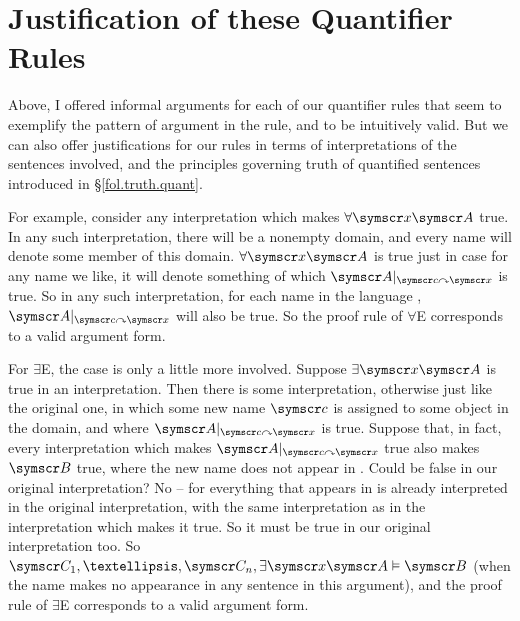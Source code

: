 \section{Justification of these Quantifier Rules}

Above, I offered informal arguments for each of our quantifier rules that seem to exemplify the pattern of argument in the rule, and to be intuitively valid. But we can also offer justifications for our rules in terms of interpretations of the sentences involved, and the principles governing truth of quantified sentences introduced in §\ref{fol.truth.quant}. 

For example, consider any interpretation which makes $\forall\meta{x}\meta{A}$ true. In any such interpretation, there will be a nonempty domain, and every name will denote some member of this domain. $\forall\meta{x}\meta{A}$ is true just in case for any name we like, it will denote something of which $\meta{A}\subs{\meta{c}}{\meta{x}}$ is true. So in any such interpretation, for each name in the language , $\meta{A}\subs{\meta{c}}{\meta{x}}$ will also be true. So the proof rule of $\forall$E corresponds to a valid argument form.

For $\exists$E, the case is only a little more involved. Suppose $\exists\meta{x}\meta{A}$ is true in an interpretation. Then there is some interpretation, otherwise just like the original one, in which some new name $\meta{c}$ is assigned to some object in the domain, and where $\meta{A}\subs{\meta{c}}{\meta{x}}$ is true. Suppose that, in fact, every interpretation which makes $\meta{A}\subs{\meta{c}}{\meta{x}}$ true also makes  $\meta{B}$ true, where the new name  does not appear in . Could  be false in our original interpretation? No – for everything that appears in  is already interpreted in the original interpretation, with the same interpretation as in the interpretation which makes it true. So it must be true in our original interpretation too. So $\meta{C}_{1},…,\meta{C}_{n},\exists\meta{x}\meta{A}\entails \meta{B}$ (when the name  makes no appearance in any sentence in this argument), and the proof rule of $\exists$E corresponds to a valid argument form.

